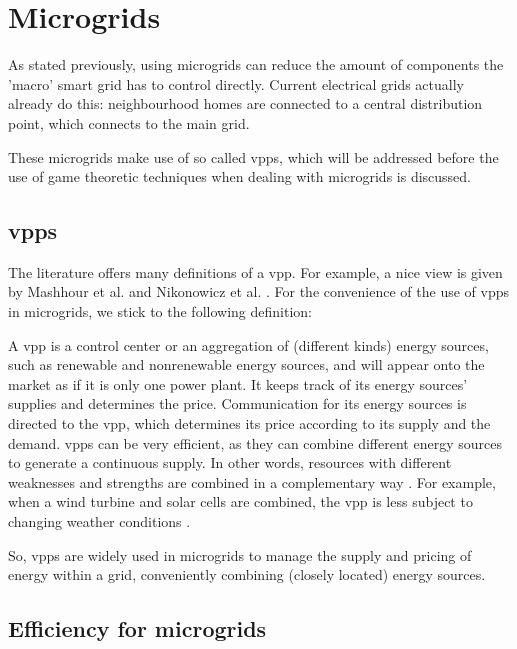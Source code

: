 \section{Microgrids}
As stated previously, using microgrids can reduce the amount of components the 'macro' smart grid has to control directly. Current electrical grids actually already do this: neighbourhood homes are connected to a central distribution point, which connects to the main grid.

These microgrids make use of so called \acp{vpp}, which will be addressed before the use of game theoretic techniques when dealing with microgrids is discussed.

\subsection{\aclp{vpp}}
The literature offers many definitions of a \ac{vpp}. For example, a nice view is given by Mashhour et al. \cite{MashhourMoghaddas-Tafreshi2011} and Nikonowicz et al. \cite{NikonowiczMilewski2012}.  For the convenience of the use of \acp{vpp} in microgrids, we stick to the following definition:

A \ac{vpp} is a control center or an aggregation of (different kinds) energy sources, such as renewable and nonrenewable energy sources, and will appear onto the market as if it is only one power plant. It keeps track of its energy sources' supplies and determines the price. Communication for its energy sources is directed to the \ac{vpp}, which determines its price according to its supply and the demand. \acp{vpp} can be very efficient, as they can combine different energy sources to generate a continuous supply. In other words, resources with different weaknesses and strengths are combined in a complementary way \cite{Koeppel2003}. For example, when a wind turbine and solar cells are combined, the \ac{vpp} is less subject to changing weather conditions \cite{Tromly2001, Kumagai2012, MashhourMoghaddas-Tafreshi2011, NikonowiczMilewski2012}. 

So, \acp{vpp} are widely used in microgrids to manage the supply and pricing of energy within a grid, conveniently combining (closely located) energy sources.  


\subsection{Efficiency for microgrids}


